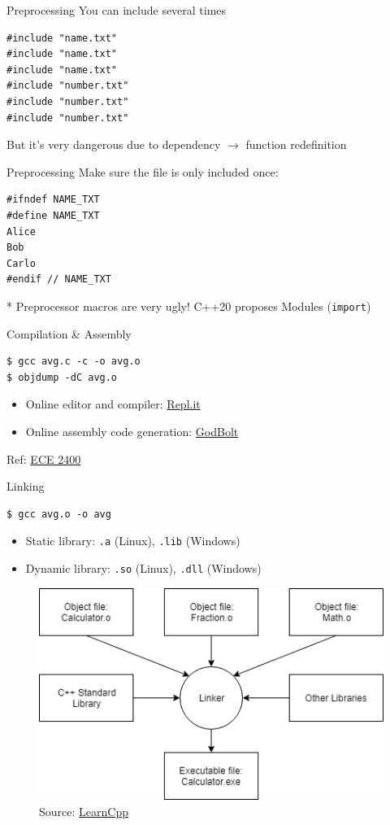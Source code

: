 \documentclass{../TexTemplate/myslide}
\begin{document}
\begin{frame}[fragile]{Preprocessing}
You can include several times
\begin{lstlisting}
#include "name.txt"
#include "name.txt"
#include "name.txt"
#include "number.txt"
#include "number.txt"
#include "number.txt"
\end{lstlisting}
But it's very dangerous due to dependency $\to$ function redefinition
\end{frame}

\begin{frame}[fragile]{Preprocessing}
Make sure the file is only included once:
\begin{lstlisting}
#ifndef NAME_TXT
#define NAME_TXT
Alice
Bob
Carlo
#endif // NAME_TXT
\end{lstlisting}
\pause
* Preprocessor macros are very ugly! C++20 proposes Modules (\verb'import')
\end{frame}

\begin{frame}[fragile]{Compilation \& Assembly}
\begin{verbatim}
$ gcc avg.c -c -o avg.o
$ objdump -dC avg.o
\end{verbatim}
\begin{itemize}
	\item Online editor and compiler: \href{https://repl.it/}{Repl.it}
	\item Online assembly code generation: \href{https://godbolt.org}{GodBolt}
\end{itemize}
\scriptsize Ref: \href{https://cornell-ece2400.github.io/ece2400-docs/ece2400-sec2-c-basics/}{ECE 2400}
\end{frame}

\begin{frame}[fragile]{Linking}
\begin{verbatim}
$ gcc avg.o -o avg
\end{verbatim}
\begin{itemize}
	\item Static library: \verb'.a' (Linux), \verb'.lib' (Windows)
	\item Dynamic library: \verb'.so' (Linux), \verb'.dll' (Windows)
\end{itemize}
\begin{figure}
\centering
\includegraphics[width=0.5\linewidth]{fig/linking.png}
\caption*{\scriptsize Source: \href{https://www.learncpp.com/cpp-tutorial/introduction-to-the-compiler-linker-and-libraries/}{LearnCpp}}
\end{figure}
\end{frame}
\end{document}
